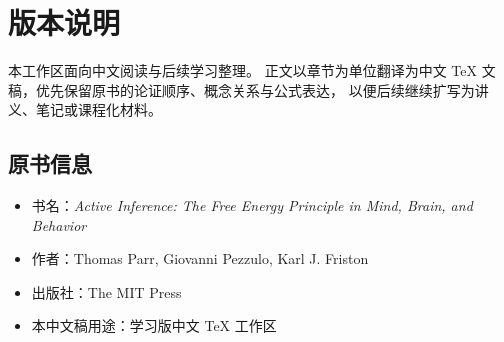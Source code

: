 \chapter*{版本说明}

\begin{projectnote}
本工作区面向中文阅读与后续学习整理。
正文以章节为单位翻译为中文 TeX 文稿，优先保留原书的论证顺序、概念关系与公式表达，
以便后续继续扩写为讲义、笔记或课程化材料。
\end{projectnote}

\section*{原书信息}
\begin{itemize}[leftmargin=2em]
\item 书名：\textit{Active Inference: The Free Energy Principle in Mind, Brain, and Behavior}
\item 作者：Thomas Parr, Giovanni Pezzulo, Karl J. Friston
\item 出版社：The MIT Press
\item 本中文稿用途：学习版中文 TeX 工作区
\end{itemize}
